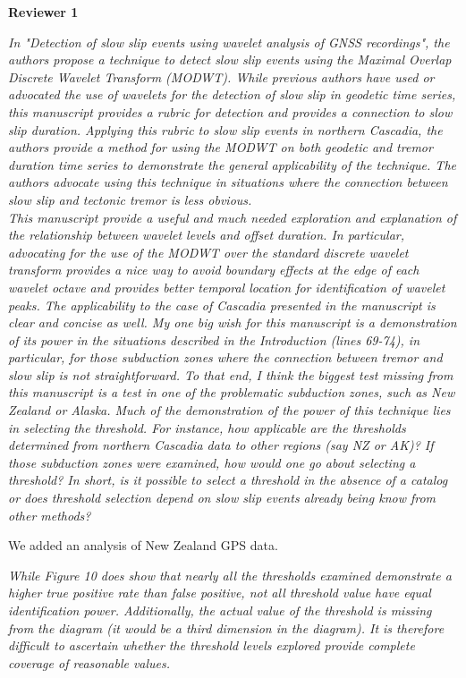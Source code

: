 \documentclass[letterpaper, 12pt]{article}
\begin{document}
\textbf{Reviewer 1}

\bigskip

\textit{In "Detection of slow slip events using wavelet analysis of GNSS recordings", the authors propose a technique to detect slow slip events using the Maximal Overlap Discrete Wavelet Transform (MODWT). While previous authors have used or advocated the use of wavelets for the detection of slow slip in geodetic time series, this manuscript provides a rubric for detection and provides a connection to slow slip duration. Applying this rubric to slow slip events in northern Cascadia, the authors provide a method for using the MODWT on both geodetic and tremor duration time series to demonstrate the general applicability of the technique. The authors advocate using this technique in situations where the connection between slow slip and tectonic tremor is less obvious.} \\

\textit{This manuscript provide a useful and much needed exploration and explanation of the relationship between wavelet levels and offset duration. In particular, advocating for the use of the MODWT over the standard discrete wavelet transform provides a nice way to avoid boundary effects at the edge of each wavelet octave and provides better temporal location for identification of wavelet peaks. The applicability to the case of Cascadia presented in the manuscript is clear and concise as well. My one big wish for this manuscript is a demonstration of its power in the situations described in the Introduction (lines 69-74), in particular, for those subduction zones where the connection between tremor and slow slip is not straightforward. To that end, I think the biggest test missing from this manuscript is a test in one of the problematic subduction zones, such as New Zealand or Alaska. Much of the demonstration of the power of this technique lies in selecting the threshold. For instance, how applicable are the thresholds determined from northern Cascadia data to other regions (say NZ or AK)? If those subduction zones were examined, how would one go about selecting a threshold? In short, is it possible to select a threshold in the absence of a catalog or does threshold selection depend on slow slip events already being know from other methods?}

\bigskip

We added an analysis of New Zealand GPS data.

\bigskip

\textit{While Figure 10 does show that nearly all the thresholds examined demonstrate a higher true positive rate than false positive, not all threshold value have equal identification power. Additionally, the actual value of the threshold is missing from the diagram (it would be a third dimension in the diagram). It is therefore difficult to ascertain whether the threshold levels explored provide complete coverage of reasonable values.}
\end{document}

